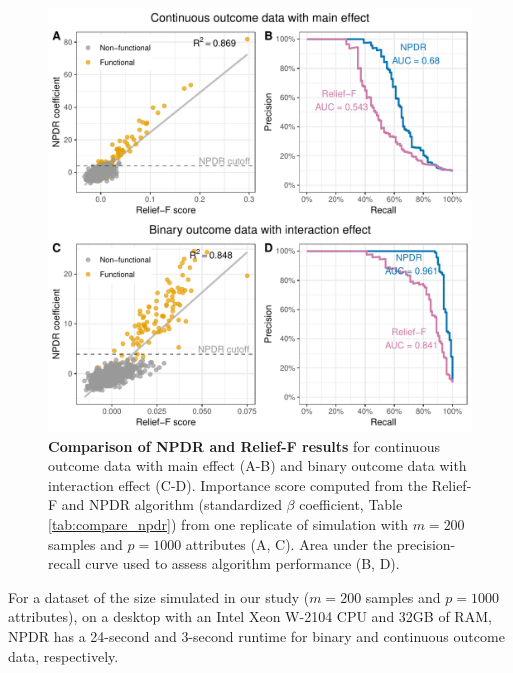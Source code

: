 \documentclass[10pt]{article}
\begin{document}
\begin{figure}[!tbp]
\centerline{\includegraphics[trim = 0 0 0 0]{../figs/fig1.pdf}}
\caption{{\bf Comparison of NPDR and Relief-F results} for continuous outcome data with main effect (A-B) and binary outcome data with interaction effect (C-D). Importance score computed from the Relief-F and NPDR algorithm (standardized $\beta$ coefficient, Table \ref{tab:compare_npdr}) from one replicate of simulation with $m = 200$ samples and $p = 1000$ attributes (A, C). Area under the precision-recall curve used to assess algorithm performance (B, D).}
\label{fig:npdr_relief}
\end{figure}
For a dataset of the size simulated in our study ($m=200$ samples and $p=1000$ attributes), on a desktop with an Intel Xeon W-2104 CPU and 32GB of RAM, NPDR has a 24-second and 3-second runtime for binary and continuous outcome data, respectively.
\end{document}
